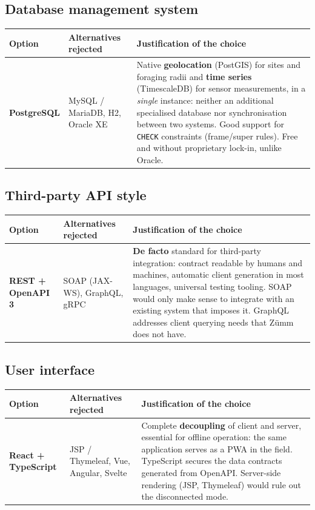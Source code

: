 \subsection{Database management system}
\begin{xltabular}{\textwidth}{>{\bfseries}p{2.7cm} p{4.2cm} X}
\toprule
\textbf{Option} & \textbf{Alternatives rejected} & \textbf{Justification of the choice} \\
\midrule
\endhead
PostgreSQL & MySQL / MariaDB, H2, Oracle XE & Native \textbf{geolocation} (PostGIS) for sites and foraging radii and \textbf{time series} (TimescaleDB) for sensor measurements, in a \emph{single} instance: neither an additional specialised database nor synchronisation between two systems. Good support for \texttt{CHECK} constraints (frame/super rules). Free and without proprietary lock-in, unlike Oracle. \\
\bottomrule
\end{xltabular}

\subsection{Third-party API style}
\begin{xltabular}{\textwidth}{>{\bfseries}p{2.7cm} p{4.2cm} X}
\toprule
\textbf{Option} & \textbf{Alternatives rejected} & \textbf{Justification of the choice} \\
\midrule
\endhead
REST + OpenAPI 3 & SOAP (JAX-WS), GraphQL, gRPC & \textbf{De facto} standard for third-party integration: contract readable by humans and machines, automatic client generation in most languages, universal testing tooling. SOAP would only make sense to integrate with an existing system that imposes it. GraphQL addresses client querying needs that Zümm does not have. \\
\bottomrule
\end{xltabular}

\subsection{User interface}
\begin{xltabular}{\textwidth}{>{\bfseries}p{2.7cm} p{4.2cm} X}
\toprule
\textbf{Option} & \textbf{Alternatives rejected} & \textbf{Justification of the choice} \\
\midrule
\endhead
React + TypeScript & JSP / Thymeleaf, Vue, Angular, Svelte & Complete \textbf{decoupling} of client and server, essential for offline operation: the same application serves as a PWA in the field. TypeScript secures the data contracts generated from OpenAPI. Server-side rendering (JSP, Thymeleaf) would rule out the disconnected mode. \\
\bottomrule
\end{xltabular}

